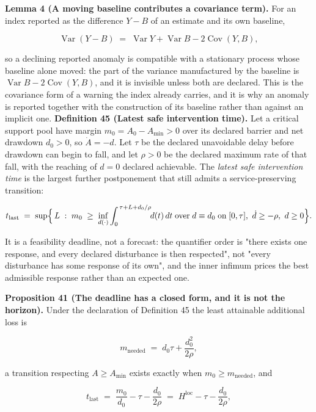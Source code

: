 \documentclass[11pt]{article}
\begin{document}
\textbf{Lemma 4 (A moving baseline contributes a covariance term).} For an index reported as the difference \(Y - B\) of an estimate and its own baseline, 

$$\operatorname{Var}(Y - B) \;=\; \operatorname{Var} Y + \operatorname{Var} B - 2\operatorname{Cov}(Y, B) ,$$

 so a declining reported anomaly is compatible with a stationary process whose baseline alone moved: the part of the variance manufactured by the baseline is \(\operatorname{Var} B - 2\operatorname{Cov}(Y,\allowbreak{} B)\), and it is invisible unless both are declared. This is the covariance form of a warning the index already carries, and it is why an anomaly is reported together with the construction of its baseline rather than against an implicit one. \textbf{Definition 45 (Latest safe intervention time).} Let a critical support pool have margin \(m_0 = A_0 - A_{\min} > 0\) over its declared barrier and net drawdown \(d_0 > 0\), so \(\dot A = -d\). Let \(\tau\) be the declared unavoidable delay before drawdown can begin to fall, and let \(\rho > 0\) be the declared maximum rate of that fall, with the reaching of \(d = 0\) declared achievable. The \emph{latest safe intervention time} is the largest further postponement that still admits a service-preserving transition: 

$$t_{\mathrm{last}} \;=\; \sup\Bigl\{\, L \;:\; m_0 \;\ge\; \inf_{d(\cdot)} \int_0^{\,\tau+L+d_0/\rho} \!\! d(t)\,dt \;\text{over}\; d \equiv d_0 \;\text{on}\; [0,\tau],\ \dot d \ge -\rho,\ d \ge 0 \Bigr\} .$$

 It is a feasibility deadline, not a forecast: the quantifier order is "there exists one response, and every declared disturbance is then respected", not "every disturbance has some response of its own", and the inner infimum prices the best admissible response rather than an expected one.

\textbf{Proposition 41 (The deadline has a closed form, and it is not the horizon).} Under the declaration of Definition 45 the least attainable additional loss is 

$$m_{\mathrm{needed}} \;=\; d_0\tau + \frac{d_0^{2}}{2\rho} ,$$

 a transition respecting \(A \ge A_{\min}\) exists exactly when \(m_0 \ge m_{\mathrm{needed}}\), and 

$$t_{\mathrm{last}} \;=\; \frac{m_0}{d_0} - \tau - \frac{d_0}{2\rho} \;=\; H^{\mathrm{loc}} - \tau - \frac{d_0}{2\rho} ,$$
\end{document}

